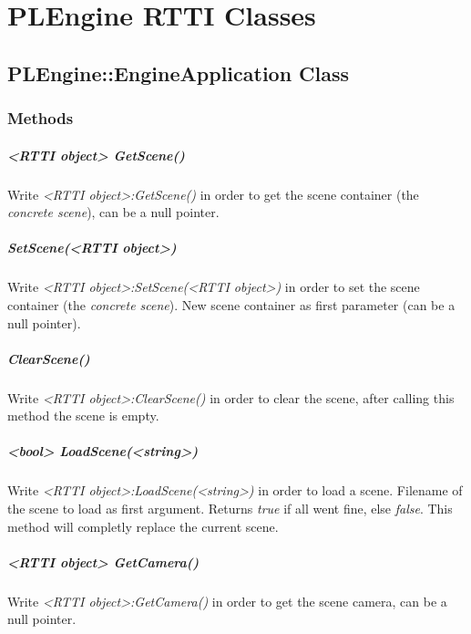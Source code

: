 \chapter{PLEngine \ac{RTTI} Classes}




\section{PLEngine::EngineApplication Class}


\subsection{Methods}

\paragraph{<RTTI object> GetScene()}
Write \emph{<RTTI object>:GetScene()} in order to get the scene container (the \emph{concrete scene}), can be a null pointer.

\paragraph{SetScene(<RTTI object>)}
Write \emph{<RTTI object>:SetScene(<RTTI object>)} in order to set the scene container (the \emph{concrete scene}). New scene container as first parameter (can be a null pointer).

\paragraph{ClearScene()}
Write \emph{<RTTI object>:ClearScene()} in order to clear the scene, after calling this method the scene is empty.

\paragraph{<bool> LoadScene(<string>)}
Write \emph{<RTTI object>:LoadScene(<string>)} in order to load a scene. Filename of the scene to load as first argument. Returns \emph{true} if all went fine, else \emph{false}. This method will completly replace the current scene.

\paragraph{<RTTI object> GetCamera()}
Write \emph{<RTTI object>:GetCamera()} in order to get the scene camera, can be a null pointer.

